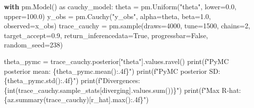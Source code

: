 \documentclass[
  letterpaper,
  DIV=11,
  numbers=noendperiod]{scrartcl}
\newenvironment{Shaded}{\begin{snugshade}}{\end{snugshade}}
\newcommand{\BuiltInTok}[1]{\textcolor[rgb]{0.00,0.23,0.31}{#1}}
\newcommand{\ControlFlowTok}[1]{\textcolor[rgb]{0.00,0.23,0.31}{\textbf{#1}}}
\newcommand{\DecValTok}[1]{\textcolor[rgb]{0.68,0.00,0.00}{#1}}
\newcommand{\FloatTok}[1]{\textcolor[rgb]{0.68,0.00,0.00}{#1}}
\newcommand{\ImportTok}[1]{\textcolor[rgb]{0.00,0.46,0.62}{#1}}
\newcommand{\NormalTok}[1]{\textcolor[rgb]{0.00,0.23,0.31}{#1}}
\newcommand{\OperatorTok}[1]{\textcolor[rgb]{0.37,0.37,0.37}{#1}}
\newcommand{\SpecialCharTok}[1]{\textcolor[rgb]{0.37,0.37,0.37}{#1}}
\newcommand{\SpecialStringTok}[1]{\textcolor[rgb]{0.13,0.47,0.30}{#1}}
\newcommand{\StringTok}[1]{\textcolor[rgb]{0.13,0.47,0.30}{#1}}
\newcommand{\VariableTok}[1]{\textcolor[rgb]{0.07,0.07,0.07}{#1}}
\begin{document}
\begin{Shaded}
\begin{Highlighting}[]
\ControlFlowTok{with}\NormalTok{ pm.Model() }\ImportTok{as}\NormalTok{ cauchy\_model:}
\NormalTok{    theta }\OperatorTok{=}\NormalTok{ pm.Uniform(}\StringTok{"theta"}\NormalTok{, lower}\OperatorTok{=}\FloatTok{0.0}\NormalTok{, upper}\OperatorTok{=}\FloatTok{100.0}\NormalTok{)}
\NormalTok{    y\_obs }\OperatorTok{=}\NormalTok{ pm.Cauchy(}\StringTok{"y\_obs"}\NormalTok{, alpha}\OperatorTok{=}\NormalTok{theta, beta}\OperatorTok{=}\FloatTok{1.0}\NormalTok{, observed}\OperatorTok{=}\NormalTok{x\_obs)}
\NormalTok{    trace\_cauchy }\OperatorTok{=}\NormalTok{ pm.sample(draws}\OperatorTok{=}\DecValTok{4000}\NormalTok{, tune}\OperatorTok{=}\DecValTok{1500}\NormalTok{, chains}\OperatorTok{=}\DecValTok{2}\NormalTok{,}
\NormalTok{                             target\_accept}\OperatorTok{=}\FloatTok{0.9}\NormalTok{, return\_inferencedata}\OperatorTok{=}\VariableTok{True}\NormalTok{,}
\NormalTok{                             progressbar}\OperatorTok{=}\VariableTok{False}\NormalTok{, random\_seed}\OperatorTok{=}\DecValTok{238}\NormalTok{)}

\NormalTok{theta\_pymc }\OperatorTok{=}\NormalTok{ trace\_cauchy.posterior[}\StringTok{"theta"}\NormalTok{].values.ravel()}
\BuiltInTok{print}\NormalTok{(}\SpecialStringTok{f"PyMC posterior mean: }\SpecialCharTok{\{}\NormalTok{theta\_pymc}\SpecialCharTok{.}\NormalTok{mean()}\SpecialCharTok{:.4f\}}\SpecialStringTok{"}\NormalTok{)}
\BuiltInTok{print}\NormalTok{(}\SpecialStringTok{f"PyMC posterior SD:   }\SpecialCharTok{\{}\NormalTok{theta\_pymc}\SpecialCharTok{.}\NormalTok{std()}\SpecialCharTok{:.4f\}}\SpecialStringTok{"}\NormalTok{)}
\BuiltInTok{print}\NormalTok{(}\SpecialStringTok{f"Divergences: }\SpecialCharTok{\{}\BuiltInTok{int}\NormalTok{(trace\_cauchy.sample\_stats[}\StringTok{\textquotesingle{}diverging\textquotesingle{}}\NormalTok{].values.}\BuiltInTok{sum}\NormalTok{())}\SpecialCharTok{\}}\SpecialStringTok{"}\NormalTok{)}
\BuiltInTok{print}\NormalTok{(}\SpecialStringTok{f"Max R{-}hat:   }\SpecialCharTok{\{}\NormalTok{az}\SpecialCharTok{.}\NormalTok{summary(trace\_cauchy)[}\StringTok{\textquotesingle{}r\_hat\textquotesingle{}}\NormalTok{]}\SpecialCharTok{.}\BuiltInTok{max}\NormalTok{()}\SpecialCharTok{:.4f\}}\SpecialStringTok{"}\NormalTok{)}


\end{Highlighting}
\end{Shaded}
\end{document}
